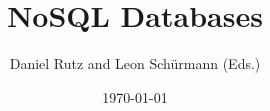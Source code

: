 \documentclass[
  12pt,
  a4paper,
  parskip,
  openany
]{scrbook}
\title{NoSQL Databases}
\author{Daniel Rutz and Leon Schürmann (Eds.)}
\date{\today}
\begin{document}
\maketitle
\tableofcontents

\printglossaries











\printbibliography

\appendix

\end{document}
